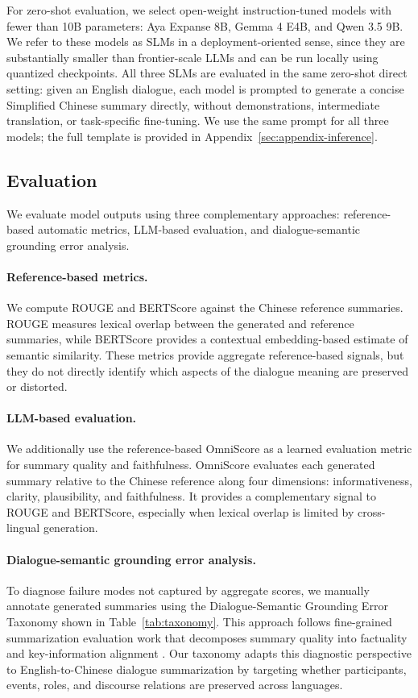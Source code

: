 \documentclass[11pt]{article}
\begin{document}
For zero-shot evaluation, we select open-weight instruction-tuned models with fewer than 10B parameters: Aya Expanse 8B, Gemma 4 E4B, and Qwen 3.5 9B. We refer to these models as SLMs in a deployment-oriented sense, since they are substantially smaller than frontier-scale LLMs and can be run locally using quantized checkpoints. All three SLMs are evaluated in the same zero-shot direct setting: given an English dialogue, each model is prompted to generate a concise Simplified Chinese summary directly, without demonstrations, intermediate translation, or task-specific fine-tuning. We use the same prompt for all three models; the full template is provided in Appendix~\ref{sec:appendix-inference}.

\subsection{Evaluation}

We evaluate model outputs using three complementary approaches: reference-based automatic metrics, LLM-based evaluation, and dialogue-semantic grounding error analysis.

\paragraph{Reference-based metrics.}
We compute ROUGE \citep{lin-2004-rouge} and BERTScore \citep{zhang2020bertscoreevaluatingtextgeneration} against the Chinese reference summaries. ROUGE measures lexical overlap between the generated and reference summaries, while BERTScore provides a contextual embedding-based estimate of semantic similarity. These metrics provide aggregate reference-based signals, but they do not directly identify which aspects of the dialogue meaning are preserved or distorted.

\paragraph{LLM-based evaluation.}
We additionally use the reference-based OmniScore \citep{alam-etal-2026-omniscore} as a learned evaluation metric for summary quality and faithfulness. OmniScore evaluates each generated summary relative to the Chinese reference along four dimensions: informativeness, clarity, plausibility, and faithfulness. It provides a complementary signal to ROUGE and BERTScore, especially when lexical overlap is limited by cross-lingual generation.

\paragraph{Dialogue-semantic grounding error analysis.}
To diagnose failure modes not captured by aggregate scores, we manually annotate generated summaries using the Dialogue-Semantic Grounding Error Taxonomy shown in Table~\ref{tab:taxonomy}. This approach follows fine-grained summarization evaluation work that decomposes summary quality into factuality and key-information alignment \citep{song-etal-2024-finesure}. Our taxonomy adapts this diagnostic perspective to English-to-Chinese dialogue summarization by targeting whether participants, events, roles, and discourse relations are preserved across languages.
\end{document}
